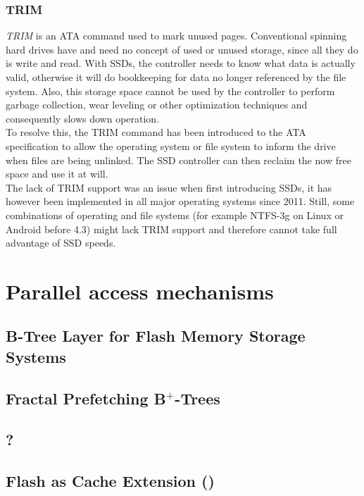 \documentclass{acm_proc_article-sp}
\begin{document}
\subsubsection*{TRIM}
\emph{TRIM} is an ATA command used to mark unused pages. Conventional spinning hard drives have and need no concept of used or unused storage, since all they do is write and read. With SSDs, the controller needs to know what data is actually valid, otherwise it will do bookkeeping for data no longer referenced by the file system. Also, this storage space cannot be used by the controller to perform garbage collection, wear leveling or other optimization techniques and consequently slows down operation.
\\
To resolve this, the TRIM command has been introduced to the ATA specification to allow the operating system or file system to inform the drive when files are being unlinked. The SSD controller can then reclaim the now free space and use it at will.
\\
The lack of TRIM support was an issue when first introducing SSDs, it has however been implemented in all major operating systems since 2011. Still, some combinations of operating and file systems (for example NTFS-3g on Linux or Android before 4.3) might lack TRIM support and therefore cannot take full advantage of SSD speeds.

\section{Parallel access mechanisms}

\subsection{B-Tree Layer for Flash Memory Storage Systems}

\cite{wu2007efficient}

\subsection{Fractal Prefetching B$^{+}$-Trees}

\cite{chen2002fractal}

\subsection{?} %

\subsection{Flash as Cache Extension ()}
\end{document}

